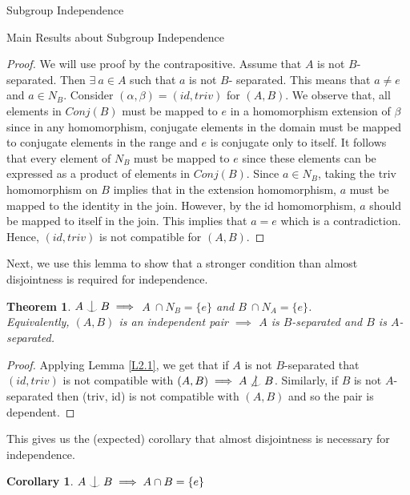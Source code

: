 \documentclass{article}
\newtheorem{theorem}{Theorem}[section]
\newtheorem{corollary}{Corollary}[section]
\def\indep{\mathrel{\raise0.2ex\hbox{\ooalign{\hidewidth$\vert$\hidewidth\cr\raise-0.9ex\hbox{$\smile$}}}}}
\begin{document}
\begin{section}{Subgroup Independence}
\begin{subsection}{Main Results about Subgroup Independence}
			\begin{proof}
				We will use proof by the contrapositive. Assume that $A$ is not $B$-separated. Then $\exists \  a \in A$ such that $a$ is not $B$- separated. This means that $a \not = e$  and  $a \in  N_B $. Consider $(\alpha, \beta) =(id, triv)$ for $(A, B)$.  We observe that, all elements in $Conj(B)$ must be mapped to $e$ in a homomorphism extension of $\beta$ since in any homomorphism, conjugate elements in the domain must be mapped to conjugate elements in the range and $e$ is conjugate only to itself. It follows that every element of $N_B $ must be mapped to $e$ since these elements can be expressed as a product of elements in $Conj(B)$. Since $a \in  N_B $, taking the triv homomorphism on $B$ implies that in the extension homomorphism, $a$ must be mapped to the identity in the join. However, by the id homomorphism, $a$ should be mapped to itself in the join. This implies that $a  = e$ which is a contradiction. Hence, $(id, triv)$ is not compatible for $(A, B)$. 
			\end{proof}
			
			
			\noindent Next, we use this lemma to show that a stronger condition than almost disjointness is required for independence.\\
			
			
			
			
			\begin{theorem}\label{mainTheorem}
				$A \indep B \implies$   $A\  \cap N_B  = \{e\}$ and  $B\  \cap N_A  = \{e\}$.\\
				
				\noindent Equivalently, $(A, B)$ is an independent pair $ \implies$ $A$ is $B$-separated and $B$ is $A$-separated.
			\end{theorem}
			
			\begin{proof}
				Applying Lemma \ref{L2.1}, we get that if $A$ is not $B$-separated that $(id, triv)$ is not compatible with $(A, B) \implies A \not \indep B$. Similarly, if $B$ is not $A$-separated then (triv, id) is not compatible with $(A, B)$ and so the pair is dependent.
			\end{proof}
			
			\noindent This gives us the (expected) corollary that almost disjointness is necessary for independence.
			
			\begin{corollary} \label{C2.1}
				$A \indep B \implies A \cap B = \{e\}$
			\end{corollary}
			

\end{subsection}
\end{section}
\end{document}
